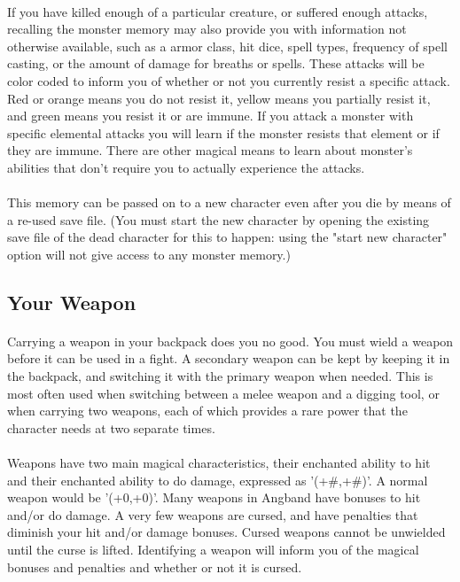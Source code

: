 \paragraph{}
If you have killed enough of a particular creature, or suffered enough
attacks, recalling the monster memory may also provide you with
information not otherwise available, such as a armor class, hit dice,
spell types, frequency of spell casting, or the amount of damage for
breaths or spells. These attacks will be color coded to inform you of
whether or not you currently resist a specific attack. Red or orange
means you do not resist it, yellow means you partially resist it, and
green means you resist it or are immune. If you attack a monster with
specific elemental attacks you will learn if the monster resists that
element or if they are immune. There are other magical means to learn
about monster's abilities that don't require you to actually experience
the attacks.
 
\paragraph{}
This memory can be passed on to a new character even after you die by means
of a re-used save file. (You must start the new character by opening the
existing save file of the dead character for this to happen: using the
"start new character" option will not give access to any monster memory.)

\subsection{Your Weapon}
\paragraph{}
Carrying a weapon in your backpack does you no good. You must wield a
weapon before it can be used in a fight. A secondary weapon can be kept
by keeping it in the backpack, and switching it with the primary weapon
when needed. This is most often used when switching between a melee
weapon and a digging tool, or when carrying two weapons, each of which
provides a rare power that the character needs at two separate times.

\paragraph{}
Weapons have two main magical characteristics, their enchanted ability
to hit and their enchanted ability to do damage, expressed as '(+\#,+\#)'.
A normal weapon would be '(+0,+0)'. Many weapons in Angband have
bonuses to hit and/or do damage. A very few weapons are cursed, and
have penalties that diminish your hit and/or damage bonuses. Cursed
weapons cannot be unwielded until the curse is lifted. Identifying a
weapon will inform you of the magical bonuses and penalties and whether
or not it is cursed.
  
